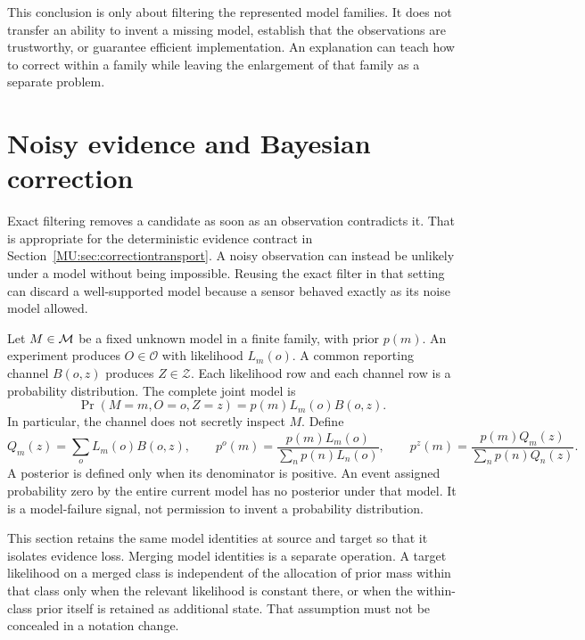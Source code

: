 This conclusion is only about filtering the represented model families. It does not transfer an ability to invent a missing model, establish that the observations are trustworthy, or guarantee efficient implementation. An explanation can teach how to correct within a family while leaving the enlargement of that family as a separate problem.

\section{Noisy evidence and Bayesian correction}\label{MU:sec:bayesian}
Exact filtering removes a candidate as soon as an observation contradicts it. That is appropriate for the deterministic evidence contract in Section~\ref{MU:sec:correctiontransport}. A noisy observation can instead be unlikely under a model without being impossible. Reusing the exact filter in that setting can discard a well-supported model because a sensor behaved exactly as its noise model allowed.

Let $M\in\mathcal M$ be a fixed unknown model in a finite family, with prior $p(m)$. An experiment produces $O\in\mathcal O$ with likelihood $L_m(o)$. A common reporting channel $B(o,z)$ produces $Z\in\mathcal Z$. Each likelihood row and each channel row is a probability distribution. The complete joint model is
\begin{equation}\label{MU:eq:bayes-joint}
\Pr(M=m,O=o,Z=z)=p(m)L_m(o)B(o,z).
\end{equation}
In particular, the channel does not secretly inspect $M$. Define
\[
Q_m(z)=\sum_o L_m(o)B(o,z),\qquad
p^o(m)=\frac{p(m)L_m(o)}{\sum_n p(n)L_n(o)},\qquad
p^z(m)=\frac{p(m)Q_m(z)}{\sum_n p(n)Q_n(z)}.
\]
A posterior is defined only when its denominator is positive. An event assigned probability zero by the entire current model has no posterior under that model. It is a model-failure signal, not permission to invent a probability distribution.

This section retains the same model identities at source and target so that it isolates evidence loss. Merging model identities is a separate operation. A target likelihood on a merged class is independent of the allocation of prior mass within that class only when the relevant likelihood is constant there, or when the within-class prior itself is retained as additional state. That assumption must not be concealed in a notation change.

